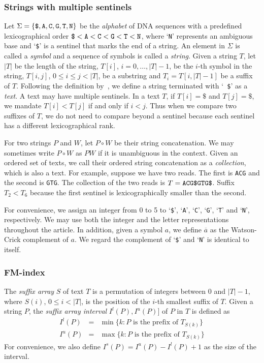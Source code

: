 \documentclass{bioinfo}
\begin{document}
\begin{methods}
\subsubsection{Strings with multiple sentinels}

Let $\Sigma=\{\mbox{\tt \$},\mbox{\tt A},\mbox{\tt C},\mbox{\tt G},\mbox{\tt
T},\mbox{\tt N}\}$ be the \emph{alphabet} of DNA sequences with a predefined
lexicographical order $\mbox{\tt \$}<\mbox{\tt A}<\mbox{\tt C}<\mbox{\tt
G}<\mbox{\tt T}<\mbox{\tt N}$, where `{\tt N}' represents an ambiguous base and
`{\tt \$}' is a sentinel that marks the end of a string. An element in $\Sigma$
is called a \emph{symbol} and a sequence of symbols is called a \emph{string}.
Given a string $T$, let $|T|$ be the length of the string, $T[i]$,
$i=0,\ldots,|T|-1$, be the $i$-th symbol in the string, $T[i,j]$, $0\le i\le
j<|T|$, be a substring and $T_i=T[i,|T|-1]$ be a suffix of $T$. Following
the definition by~\citet{en:2009fk}, we define a string terminated with `{\tt
\$}' as a \emph{text}. A text may have multiple sentinels. In a text $T$, if
$T[i]=\$$ and $T[j]=\$$, we mandate $T[i]<T[j]$ if and only if $i<j$. Thus when
we compare two suffixes of $T$, we do not need to compare beyond a sentinel
because each sentinel has a different lexicographical rank.

For two strings $P$ and $W$, let $P\circ W$ be their string concatenation.
We may sometimes write $P\circ W$ as $PW$ if it is unambiguous in the context.
Given an ordered set of texts, we call their ordered string concatenation
as a \emph{collection}, which is also a text. For example, suppose we have
two reads. The first is {\tt ACG} and the second is {\tt GTG}. The collection
of the two reads is $T=\mbox{\tt ACG\$GTG\$}$. Suffix $T_2<T_6$ because the first
sentinel is lexicographically smaller than the second.

For convenience, we assign an integer from 0 to 5 to `{\tt \$}', `{\tt A}',
`{\tt C}', `{\tt G}', `{\tt T}' and `{\tt N}', respectively. We may use both
the integer and the letter representations throughout the article. In addition,
given a symbol $a$, we define $\overline{a}$ as the Watson-Crick complement of $a$.
We regard the complement of `{\tt \$}' and `{\tt N}' is identical to itself.

\subsubsection{FM-index}

The \emph{suffix array} $S$ of text $T$ is a permutation of integers between 0 and
$|T|-1$, where $S(i)$, $0\le i<|T|$, is the position of the $i$-th smallest
suffix of $T$. Given a string $P$, the \emph{suffix array interval}
$I^l(P),I^u(P)]$ of $P$ in $T$ is defined as
\begin{eqnarray*}
I^l(P)&=&\min\{k:\mbox{$P$ is the prefix of $T_{S(k)}$}\}\\
I^u(P) &=&\max\{k:\mbox{$P$ is the prefix of $T_{S(k)}$}\}
\end{eqnarray*}
For convenience, we also define $I^s(P)=I^u(P)-I^l(P)+1$ as the size of the interval.


\end{methods}
\end{document}
